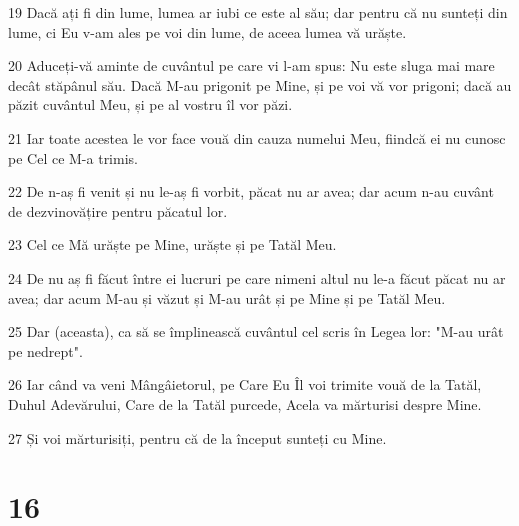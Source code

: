 \par 19 Dacă ați fi din lume, lumea ar iubi ce este al său; dar pentru că nu sunteți din lume, ci Eu v-am ales pe voi din lume, de aceea lumea vă urăște.
\par 20 Aduceți-vă aminte de cuvântul pe care vi l-am spus: Nu este sluga mai mare decât stăpânul său. Dacă M-au prigonit pe Mine, și pe voi vă vor prigoni; dacă au păzit cuvântul Meu, și pe al vostru îl vor păzi.
\par 21 Iar toate acestea le vor face vouă din cauza numelui Meu, fiindcă ei nu cunosc pe Cel ce M-a trimis.
\par 22 De n-aș fi venit și nu le-aș fi vorbit, păcat nu ar avea; dar acum n-au cuvânt de dezvinovățire pentru păcatul lor.
\par 23 Cel ce Mă urăște pe Mine, urăște și pe Tatăl Meu.
\par 24 De nu aș fi făcut între ei lucruri pe care nimeni altul nu le-a făcut păcat nu ar avea; dar acum M-au și văzut și M-au urât și pe Mine și pe Tatăl Meu.
\par 25 Dar (aceasta), ca să se împlinească cuvântul cel scris în Legea lor: "M-au urât pe nedrept".
\par 26 Iar când va veni Mângâietorul, pe Care Eu Îl voi trimite vouă de la Tatăl, Duhul Adevărului, Care de la Tatăl purcede, Acela va mărturisi despre Mine.
\par 27 Și voi mărturisiți, pentru că de la început sunteți cu Mine.

\chapter{16}

